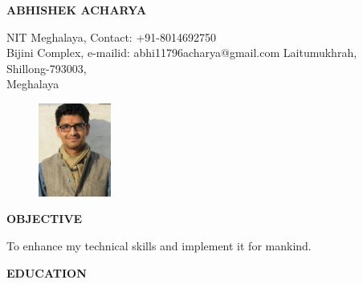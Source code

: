 \documentclass{article}
\begin{document}
	
	\begin{center}
		{
			\large\textbf{ABHISHEK ACHARYA}
		}
		
	\end{center}
	
	\begin{flushleft}
		NIT Meghalaya, 		\hspace{2.8in}    		    Contact: +91-8014692750            \\
		Bijini Complex, 		\hspace{2.85in}		    e-mailid: abhi11796acharya@gmail.com
		Laitumukhrah, \\
		Shillong-793003,     \\
		Meghalaya       \\
	\end{flushleft}
	\vspace{-0.3in}
	
	\begin{figure}[h]
		\hspace{4.4in}
		\includegraphics[width=90px]{Abhishek}
	\end{figure}
	
	\begin{flushleft}
		\textbf{OBJECTIVE}
		
		\vspace{-0.20in}
		\hspace{1.5in}
		To enhance my technical skills and implement it for mankind.\\
	\end{flushleft}
	
	\begin{flushleft}
		
		\textbf{EDUCATION}
	\end{flushleft}
	
\end{document}
